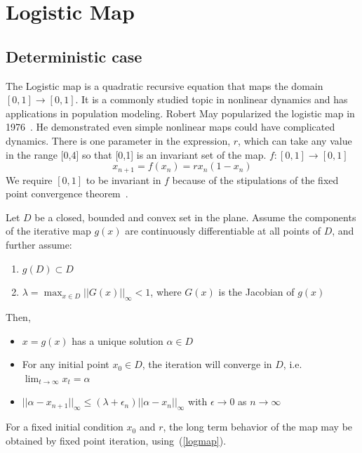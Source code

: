 \section{Logistic Map}
\subsection{Deterministic case}
\hspace{5mm}The Logistic map is a quadratic recursive equation that maps the domain
$[0,1] \rightarrow [0,1]$. It is a commonly studied topic in nonlinear dynamics and has
applications in population modeling. Robert May popularized the
logistic map in 1976~\cite{may}. He demonstrated even simple nonlinear
maps could have complicated dynamics. There is one parameter in the
expression, $r$, which can take any value in the range [0,4] so that
[0,1] is an invariant set of the map. $f:[0,1]\to [0,1]$
\begin{equation}\label{logmap}
x_{n+1} = f(x_n) = rx_n(1-x_n)
\end{equation}
We require $[0,1]$ to be invariant in $f$ because of the stipulations
of the fixed point convergence theorem~\cite{atkinson}.
\begin{singlespace}
\begin{theorem}\label{thm:fp}
Let $D$ be a closed, bounded and convex set in the plane. Assume the
components of the iterative map $g(x)$ are continuously differentiable at all points of
$D$, and further assume: 
\begin{enumerate}
\item $g(D) \subset D$
\item $\lambda =\max_{x\in D}||G(x)||_\infty < 1$, where $G(x)$ is the Jacobian of
$g(x)$
\end{enumerate}
Then, 
\begin{itemize}
\item $x=g(x)$ has a unique solution $\alpha \in D$
\item For any initial point $x_0 \in D$, the iteration will converge
  in $D$, i.e. $\lim_{t \to \infty}x_t = \alpha$
\item $||\alpha - x_{n+1}||_\infty \leq
  (\lambda +\epsilon_n)||\alpha - x_n||_\infty$ with
  $\epsilon \to 0$ as $n\to \infty$
\end{itemize}
\end{theorem}
\end{singlespace}
 For a fixed initial condition $x_0$ and $r$, the long term behavior of
the map may be obtained by fixed point iteration, using~(\ref{logmap}). 
